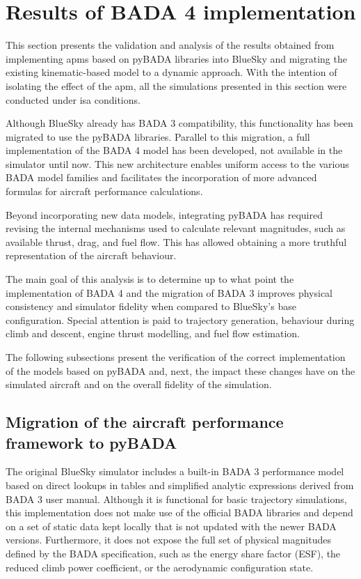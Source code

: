 \section{Results of BADA 4 implementation}
This section presents the validation and analysis of the results obtained from implementing \gls{apm}s based on pyBADA libraries into BlueSky and migrating the existing kinematic-based model to a dynamic approach. With the intention of isolating the effect of the \gls{apm}, all the simulations presented in this section were conducted under \gls{isa} conditions.

Although BlueSky already has BADA 3 compatibility, this functionality has been migrated to use the pyBADA libraries. Parallel to this migration, a full implementation of the BADA 4 model has been developed, not available in the simulator until now. This new architecture enables uniform access to the various BADA model families and facilitates the incorporation of more advanced formulas for aircraft performance calculations. 

Beyond incorporating new data models, integrating pyBADA has required revising the internal mechanisms used to calculate relevant magnitudes, such as available thrust, drag, and fuel flow. This has allowed obtaining a more truthful representation of the aircraft behaviour. 

The main goal of this analysis is to determine up to what point the implementation of BADA 4 and the migration of BADA 3 improves physical consistency and simulator fidelity when compared to BlueSky's base configuration. Special attention is paid to trajectory generation, behaviour during climb and descent, engine thrust modelling, and fuel flow estimation.

The following subsections present the verification of the correct implementation of the models based on pyBADA and, next, the impact these changes have on the simulated aircraft and on the overall fidelity of the simulation.

\subsection{Migration of the aircraft performance framework to pyBADA}
The original BlueSky simulator includes a built-in BADA 3 performance model based on direct lookups in tables and simplified analytic expressions derived from BADA 3 user manual. Although it is functional for basic trajectory simulations, this implementation does not make use of the official BADA libraries and depend on a set of static data kept locally that is not updated with the newer BADA versions. Furthermore, it does not expose the full set of physical magnitudes defined by the BADA specification, such as the energy share factor (ESF), the reduced climb power coefficient, or the aerodynamic configuration state.

